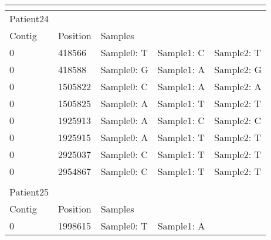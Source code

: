 \begin{longtable}{|l|l|l|l|l|}
	\hline
	\multicolumn{1}{l}{}           & \multicolumn{1}{l}{} & \multicolumn{1}{l}{}        & \multicolumn{1}{l}{} & \multicolumn{1}{l}{}  \\ 
	\hline
	\multicolumn{1}{|l}{Patient24} & \multicolumn{1}{l}{} & \multicolumn{1}{l}{}        & \multicolumn{1}{l}{} &                       \\ 
	\hline
	Contig                         & Position             & \multicolumn{1}{l}{Samples} & \multicolumn{1}{l}{} &                       \\ 
	\hline
	0                              & 418566               & Sample0: T                  & Sample1: C           & Sample2: T            \\ 
	\hline
	0                              & 418588               & Sample0: G                  & Sample1: A           & Sample2: G            \\ 
	\hline
	0                              & 1505822              & Sample0: C                  & Sample1: A           & Sample2: A            \\ 
	\hline
	0                              & 1505825              & Sample0: A                  & Sample1: T           & Sample2: T            \\ 
	\hline
	0                              & 1925913              & Sample0: A                  & Sample1: C           & Sample2: C            \\ 
	\hline
	0                              & 1925915              & Sample0: A                  & Sample1: T           & Sample2: T            \\ 
	\hline
	0                              & 2925037              & Sample0: C                  & Sample1: T           & Sample2: T            \\ 
	\hline
	0                              & 2954867              & Sample0: C                  & Sample1: T           & Sample2: T            \\ 
	\hline
	\multicolumn{1}{l}{}           & \multicolumn{1}{l}{} & \multicolumn{1}{l}{}        & \multicolumn{1}{l}{} & \multicolumn{1}{l}{}  \\ 
	\cline{1-4}
	\multicolumn{1}{|l}{Patient25} & \multicolumn{1}{l}{} & \multicolumn{1}{l}{}        &                      & \multicolumn{1}{l}{}  \\ 
	\cline{1-4}
	Contig                         & Position             & \multicolumn{1}{l}{Samples} &                      & \multicolumn{1}{l}{}  \\ 
	\cline{1-4}
	0                              & 1998615              & Sample0: T                  & Sample1: A           & \multicolumn{1}{l}{}  \\ 

\end{longtable}
